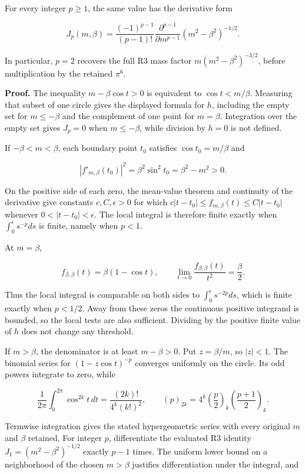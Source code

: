 \documentclass[
  11pt,
]{article}
\begin{document}
For every integer \(p\ge1\), the same value has the derivative form

\[
J_p(m,\beta)=
\frac{(-1)^{p-1}}{(p-1)!}
\frac{\partial^{p-1}}{\partial m^{p-1}}
(m^2-\beta^2)^{-1/2}.
\]

In particular, \(p=2\) recovers the full R3 mass factor
\(m(m^2-\beta^2)^{-3/2}\), before multiplication by the retained
\(\pi^6\).

\textbf{Proof.} The inequality \(m-\beta\cos t>0\) is equivalent to
\(\cos t<m/\beta\). Measuring that subset of one circle gives the
displayed formula for \(h\), including the empty set for \(m\le-\beta\)
and the complement of one point for \(m=\beta\). Integration over the
empty set gives \(J_p=0\) when \(m\le-\beta\), while division by \(h=0\)
is not defined.

If \(-\beta<m<\beta\), each boundary point \(t_0\) satisfies
\(\cos t_0=m/\beta\) and

\[
|f'_{m,\beta}(t_0)|^2
=\beta^2\sin^2t_0=\beta^2-m^2>0.
\]

On the positive side of each zero, the mean-value theorem and continuity
of the derivative give constants \(c,C,\epsilon>0\) for which
\(c|t-t_0|\le f_{m,\beta}(t)\le C|t-t_0|\) whenever
\(0<|t-t_0|<\epsilon\). The local integral is therefore finite exactly
when \(\int_0^\epsilon s^{-p}ds\) is finite, namely when \(p<1\).

At \(m=\beta\),

\[
f_{\beta,\beta}(t)=\beta(1-\cos t),
\qquad
\lim_{t\to0}\frac{f_{\beta,\beta}(t)}{t^2}=\frac\beta2.
\]

Thus the local integral is comparable on both sides to
\(\int_0^\epsilon s^{-2p}ds\), which is finite exactly when \(p<1/2\).
Away from these zeros the continuous positive integrand is bounded, so
the local tests are also sufficient. Dividing by the positive finite
value of \(h\) does not change any threshold.

If \(m>\beta\), the denominator is at least \(m-\beta>0\). Put
\(z=\beta/m\), so \(|z|<1\). The binomial series for
\((1-z\cos t)^{-p}\) converges uniformly on the circle. Its odd powers
integrate to zero, while

\[
\frac1{2\pi}\int_0^{2\pi}\cos^{2k}t\,dt
=\frac{(2k)!}{4^k(k!)^2},
\qquad
(p)_{2k}=4^k\left(\frac p2\right)_k
\left(\frac{p+1}{2}\right)_k.
\]

Termwise integration gives the stated hypergeometric series with every
original \(m\) and \(\beta\) retained. For integer \(p\), differentiate
the evaluated R3 identity \(J_1=(m^2-\beta^2)^{-1/2}\) exactly \(p-1\)
times. The uniform lower bound on a neighborhood of the chosen
\(m>\beta\) justifies differentiation under the integral, and
\end{document}
